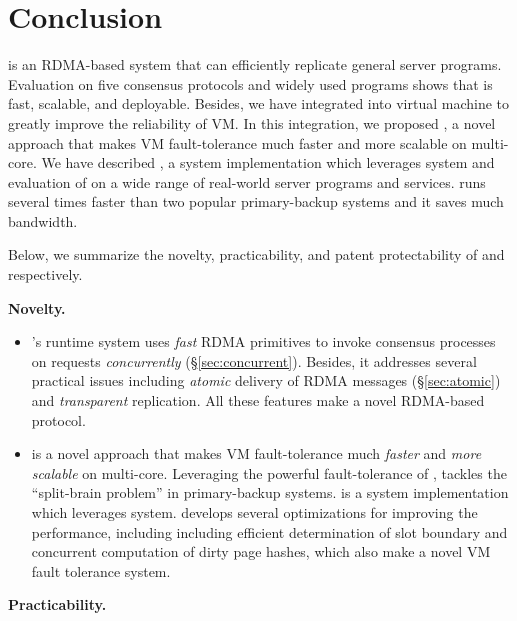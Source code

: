 \section{Conclusion} \label{sec:conclusion}

\xxx is an RDMA-based \paxos system that can efficiently replicate general 
server programs. Evaluation on five consensus protocols and \nprog widely used 
programs shows that \xxx is fast, scalable, and deployable. Besides, we have 
integrated \xxx into virtual machine to greatly improve the reliability of VM.
In this integration, we proposed \vsmr, a novel \smr approach that makes VM 
fault-tolerance much faster and more scalable on multi-core. We have described 
\yyy, a \vsmr system implementation which leverages \xxx \smr system and 
evaluation of \yyy on a wide range of real-world server programs and services. 
\yyy runs several times faster than two popular primary-backup systems and it 
saves much bandwidth.

Below, we summarize the novelty, practicability, and patent protectability of 
\xxx and \yyy respectively.

\noindent
\textbf{Novelty.}

\begin{itemize}
\item \xxx's runtime system uses \emph{fast} RDMA primitives to 
invoke consensus processes on requests \emph{concurrently} 
(\S\ref{sec:concurrent}). Besides, it addresses several practical issues 
including \emph{atomic} delivery of RDMA messages (\S\ref{sec:atomic}) and  
\emph{transparent} replication. All these features make \xxx a novel RDMA-based 
\paxos protocol.
\item \emph{\vsmr} is a novel \smr approach that makes VM fault-tolerance much 
\emph{faster} and \emph{more scalable} on multi-core. Leveraging the powerful 
fault-tolerance of \paxos, \vsmr tackles the ``split-brain 
problem'' in primary-backup systems. \yyy is a \vsmr system implementation 
which leverages \xxx \paxos system. \yyy develops several optimizations for 
improving the performance, including including efficient determination of slot 
boundary and concurrent computation of dirty page hashes, which also make \yyy a 
novel VM fault tolerance system.
\end{itemize}

\noindent
\textbf{Practicability.}

